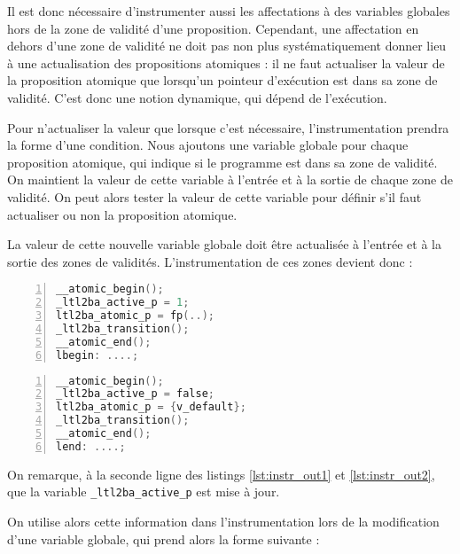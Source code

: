 Il est donc nécessaire d'instrumenter aussi les affectations à des
variables globales hors de la zone de validité d'une proposition.
Cependant, une affectation en dehors d'une zone de validité ne doit pas
non plus systématiquement donner lieu à une actualisation des
propositions atomiques : il ne faut actualiser la valeur de la proposition
atomique que lorsqu'un pointeur d'exécution est dans sa zone de
validité. C'est donc une notion dynamique, qui dépend de l'exécution.

Pour n'actualiser la valeur que lorsque c'est nécessaire,
l'instrumentation prendra la forme d'une condition. Nous ajoutons une
variable globale pour chaque proposition atomique, qui indique si le
programme est dans sa zone de validité. On maintient la valeur de cette
variable à l'entrée et à la sortie de chaque zone de validité. On peut
alors tester la valeur de cette variable pour définir s’il faut
actualiser ou non la proposition atomique.

La valeur de cette nouvelle variable globale doit être actualisée à
l'entrée et à la sortie des zones de validités. L'instrumentation de ces
zones devient donc :

\noindent\begin{minipage}{.47\textwidth}
  \begin{lstlisting}[language=C, frame=single, numbers=left,
    caption=Entrée d'une zone de validité (2), label=lst:instr_in2, xleftmargin=1.6em]
__atomic_begin();
_ltl2ba_active_p = 1;
ltl2ba_atomic_p = fp(..);
_ltl2ba_transition();
__atomic_end();
lbegin: ....;
\end{lstlisting}
\end{minipage}\hfill
\begin{minipage}{.47\textwidth}
  \begin{lstlisting}[language=C, frame=single, numbers=left,
    caption=Sortie d'une zone de validité (2), label=lst:instr_out2]
__atomic_begin();
_ltl2ba_active_p = false;
ltl2ba_atomic_p = {v_default};
_ltl2ba_transition();
__atomic_end();
lend: ....;
\end{lstlisting}
\end{minipage}

On remarque, à la seconde ligne des listings \ref{lst:instr_out1} et
\ref{lst:instr_out2}, que la variable \texttt{\_ltl2ba\_active\_p} est mise
à jour.

On utilise alors cette information dans l'instrumentation lors de la
modification d'une variable globale, qui prend alors la forme suivante :

